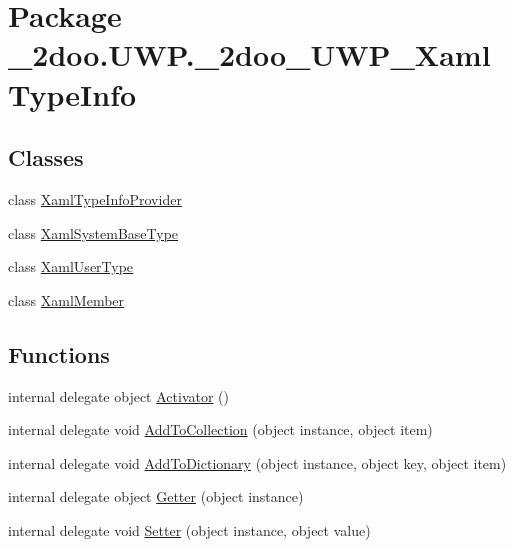 \hypertarget{namespace__2doo_1_1_u_w_p_1_1__2doo___u_w_p___xaml_type_info}{
\section{Package \_\-2doo.UWP.\_\-2doo\_\-UWP\_\-XamlTypeInfo}
\label{namespace__2doo_1_1_u_w_p_1_1__2doo___u_w_p___xaml_type_info}
}
\subsection*{Classes}
\begin{CompactItemize}
\item 
class \hyperlink{class__2doo_1_1_u_w_p_1_1__2doo___u_w_p___xaml_type_info_1_1_xaml_type_info_provider}{XamlTypeInfoProvider}
\item 
class \hyperlink{class__2doo_1_1_u_w_p_1_1__2doo___u_w_p___xaml_type_info_1_1_xaml_system_base_type}{XamlSystemBaseType}
\item 
class \hyperlink{class__2doo_1_1_u_w_p_1_1__2doo___u_w_p___xaml_type_info_1_1_xaml_user_type}{XamlUserType}
\item 
class \hyperlink{class__2doo_1_1_u_w_p_1_1__2doo___u_w_p___xaml_type_info_1_1_xaml_member}{XamlMember}
\end{CompactItemize}
\subsection*{Functions}
\begin{CompactItemize}
\item 
internal delegate object \hyperlink{namespace__2doo_1_1_u_w_p_1_1__2doo___u_w_p___xaml_type_info_c5626aea14ab42405d639dc93ce0fbf4}{Activator} ()
\item 
internal delegate void \hyperlink{namespace__2doo_1_1_u_w_p_1_1__2doo___u_w_p___xaml_type_info_43e48f43ea3d96376289a09f05c3116b}{AddToCollection} (object instance, object item)
\item 
internal delegate void \hyperlink{namespace__2doo_1_1_u_w_p_1_1__2doo___u_w_p___xaml_type_info_b2f5b65cf492f4dd16ae42c7a87edcd5}{AddToDictionary} (object instance, object key, object item)
\item 
internal delegate object \hyperlink{namespace__2doo_1_1_u_w_p_1_1__2doo___u_w_p___xaml_type_info_83c5abd38b6122306bad19bb722b0359}{Getter} (object instance)
\item 
internal delegate void \hyperlink{namespace__2doo_1_1_u_w_p_1_1__2doo___u_w_p___xaml_type_info_3bc82ad258ccc8c7a99ee83f313f023a}{Setter} (object instance, object value)
\end{CompactItemize}


